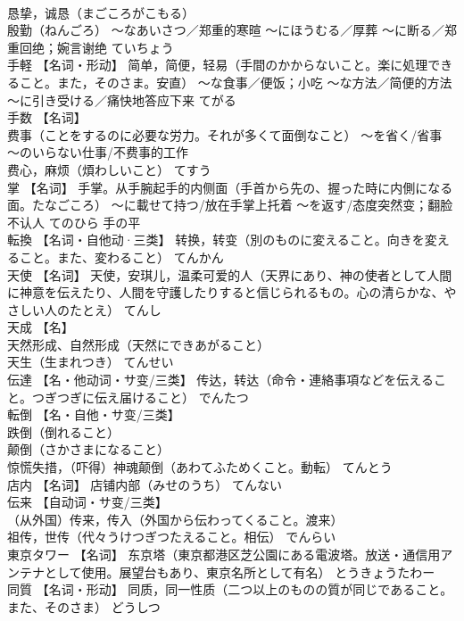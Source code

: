 \documentclass[8pt]{extreport}
\begin{document}
\begin{CJK}{UTF8}{min}
\\	恳挚，诚恳（まごころがこもる） 
\\	殷勤（ねんごろ） ～なあいさつ／郑重的寒暄 ～にほうむる／厚葬 ～に断る／郑重回绝；婉言谢绝	ていちょう	
\\	手軽	【名词・形动】 简单，简便，轻易（手間のかからないこと。楽に処理できること。また，そのさま。安直） ～な食事／便饭；小吃 ～な方法／简便的方法 ～に引き受ける／痛快地答应下来	てがる	
\\	手数	【名词】 
\\	费事（ことをするのに必要な労力。それが多くて面倒なこと） ～を省く/省事 ～のいらない仕事/不费事的工作 
\\	费心，麻烦（煩わしいこと）	てすう	
\\	掌	【名词】 手掌。从手腕起手的内侧面（手首から先の、握った時に内側になる面。たなごころ） ～に載せて持つ/放在手掌上托着 ～を返す/态度突然变；翻脸不认人	てのひら	手の平
\\	転換	【名词・自他动·三类】 转换，转变（別のものに変えること。向きを変えること。また、変わること）	てんかん	
\\	天使	【名词】 天使，安琪儿，温柔可爱的人（天界にあり、神の使者として人間に神意を伝えたり、人間を守護したりすると信じられるもの。心の清らかな、やさしい人のたとえ）	てんし	
\\	天成	【名】 
\\	天然形成、自然形成（天然にできあがること） 
\\	天生（生まれつき）	てんせい	
\\	伝達	【名・他动词・サ变/三类】 传达，转达（命令・連絡事項などを伝えること。つぎつぎに伝え届けること）	でんたつ	
\\	転倒	【名・自他・サ变/三类】 
\\	跌倒（倒れること） 
\\	颠倒（さかさまになること） 
\\	惊慌失措，（吓得）神魂颠倒（あわてふためくこと。動転）	てんとう	
\\	店内	【名词】 店铺内部（みせのうち）	てんない	
\\	伝来	【自动词・サ变/三类】 
\\	（从外国）传来，传入（外国から伝わってくること。渡来） 
\\	祖传，世传（代々うけつぎつたえること。相伝）	でんらい	
\\	東京タワー	【名词】 东京塔（東京都港区芝公園にある電波塔。放送・通信用アンテナとして使用。展望台もあり、東京名所として有名）	とうきょうたわー	
\\	同質	【名词・形动】 同质，同一性质（二つ以上のものの質が同じであること。また、そのさま）	どうしつ	

\end{CJK}
\end{document}
